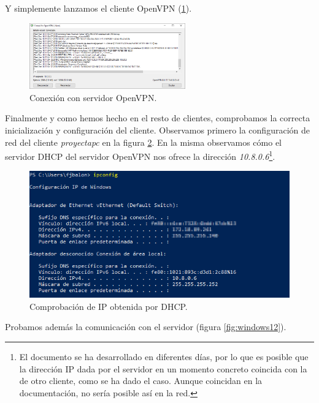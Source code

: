 \documentclass[a4paper, 11pt, titlepage]{article}
\begin{document}
        Y simplemente lanzamos el cliente OpenVPN (\ref{fig:windows10}).

        \begin{figure}[htp]
            \centering
            \includegraphics[width=0.6\textwidth]{resources/windows10.png}
            \caption{Conexión con servidor OpenVPN.}
            \label{fig:windows10}
        \end{figure}  

        \newpage
        Finalmente y como hemos hecho en el resto de clientes, comprobamos la correcta inicialización
        y configuración del cliente. Observamos primero la configuración de red del cliente \textit{proyectapc}
        en la figura \ref{fig:windows11}.
        En la misma observamos cómo el servidor DHCP del servidor OpenVPN nos ofrece la dirección 
        \textit{10.8.0.6}\footnote{
            El documento se ha desarrollado en diferentes días, por lo que es posible que la dirección
            IP dada por el servidor en un momento concreto coincida con la de otro cliente, como se ha 
            dado el caso. Aunque coincidan en la documentación, no sería posible así en la red.
        }.

        \begin{figure}[htp]
            \centering
            \includegraphics[width=1\textwidth]{resources/windows11.png}
            \caption{Comprobación de IP obtenida por DHCP.}
            \label{fig:windows11}
        \end{figure}  

        Probamos además la comunicación con el servidor (figura \ref{fig:windows12}).
\end{document}
